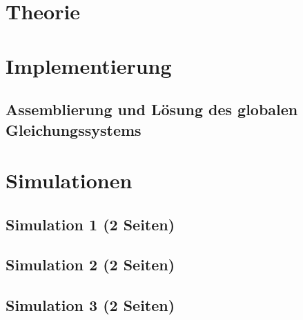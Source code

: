 \documentclass[12pt,a4paper]{scrartcl}
\begin{document}




%


\section{Theorie}








\section{Implementierung}








\subsection{Assemblierung und Lösung des globalen Gleichungssystems}
\label{sec:assembling}


\section{Simulationen}
\subsection{Simulation 1 (2 Seiten)}
\subsection{Simulation 2 (2 Seiten)}
\subsection{Simulation 3 (2 Seiten)}


\newpage
{}

\end{document}
